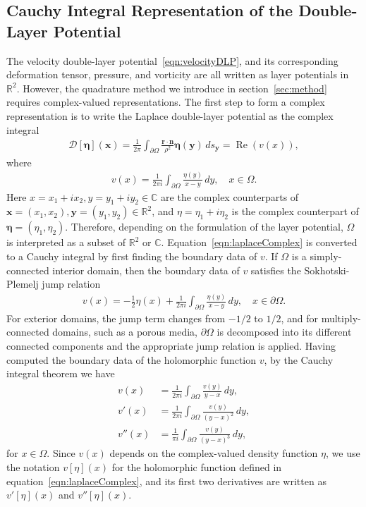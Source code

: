 \documentclass[3p]{elsarticle}
\newcommand{\Real}{\Re}
\newcommand{\bd}{{\partial}}
\newcommand{\CC}{{\mathbb{C}}}
\newcommand{\DD}{{\mathcal{D}}}
\newcommand{\eeta}{{\boldsymbol\eta}}
\newcommand{\nn}{{\mathbf{n}}}
\newcommand{\rr}{{\mathbf{r}}}
\renewcommand{\Re}{{\operatorname{Re}}}
\newcommand{\RR}{{\mathbb{R}}}
\newcommand{\xx}{{\mathbf{x}}}
\newcommand{\yy}{{\mathbf{y}}}
\begin{document}
\subsection{Cauchy Integral Representation of the Double-Layer
Potential}
\label{sec:DLPcomplex}
The velocity double-layer potential~\eqref{eqn:velocityDLP}, and its
corresponding deformation tensor, pressure, and vorticity are all
written as layer potentials in $\RR^2$.  However, the quadrature method
we introduce in section~\ref{sec:method} requires complex-valued
representations. The first step to form a complex representation is to
write the Laplace double-layer potential as the complex integral
\begin{align}
  \DD[\eeta](\xx) = \frac{1}{2\pi} \int_{\bd\Omega} 
    \frac{\rr \cdot \nn}{\rho^2}\eeta(\yy)\, ds_\yy = \Real (v(x)),
\end{align}
where
\begin{align}
  v(x) = \frac{1}{2\pi i} \int_{\bd\Omega}
    \frac{\eta(y)}{x - y} \, dy, \quad x \in \Omega.
  \label{eqn:laplaceComplex}
\end{align}
Here $x = x_1 + i x_2,y = y_1 + i y_2 \in \CC$ are the complex
counterparts of $\xx = (x_1,x_2),\yy = (y_1,y_2) \in \RR^2$, and $\eta =
\eta_1 + i \eta_2$ is the complex counterpart of $\eeta =
(\eta_1,\eta_2)$. Therefore, depending on the formulation of the layer
potential, $\Omega$ is interpreted as a subset of $\RR^2$ or $\CC$.
Equation~\eqref{eqn:laplaceComplex} is converted to a Cauchy integral by
first finding the boundary data of $v$. If $\Omega$ is a
simply-connected interior domain, then the boundary data of $v$
satisfies the Sokhotski-Plemelj jump relation
\begin{align}
  \label{eqn:SPrelation}
  v(x) = - \frac{1}{2} \eta(x) + \frac{1}{2\pi i} \int_{\bd\Omega}
    \frac{\eta(y)}{x-y}\, dy, \quad x \in \bd\Omega.
\end{align}
For exterior domains, the jump term changes from $-1/2$ to $1/2$, and
for multiply-connected domains, such as a porous media, $\bd\Omega$ is
decomposed into its different connected components and the appropriate
jump relation is applied.  Having computed the boundary data of the
holomorphic function $v$, by the Cauchy integral theorem we have
\begin{subequations}
  \label{eqn:cauchy}
  \begin{alignat}{3}
  v(x) &= \frac{1}{2\pi i}\int_{\bd\Omega} 
    \frac{v(y)}{y-x} \,dy, \\
  v'(x) &= \frac{1}{2\pi i} \int_{\bd\Omega}
    \frac{v(y)}{(y-x)^2} \, dy, \\
  v''(x) &= \frac{1}{\pi i} \int_{\bd\Omega}
    \frac{v(y)}{(y-x)^3} \, dy,
  \end{alignat}
\end{subequations}
for $x \in \Omega$.  Since $v(x)$ depends on the complex-valued density
function $\eta$, we use the notation $v[\eta](x)$ for the holomorphic
function defined in equation~\eqref{eqn:laplaceComplex}, and its first
two derivatives are written as $v'[\eta](x)$ and $v''[\eta](x)$.  
  
\end{document}
